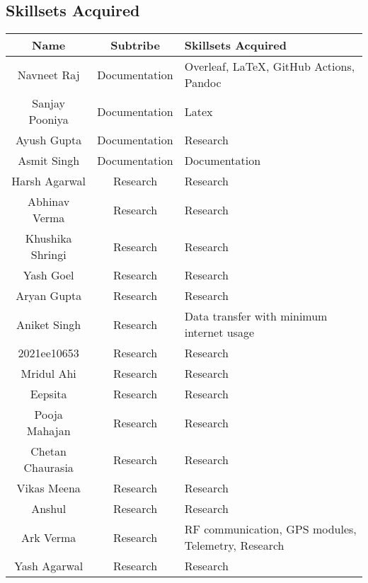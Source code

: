 \subsection{Skillsets Acquired}
\begin{center}
    \label{table:skillsets}
    \begin{longtable}{ | c | c | m{6cm} | }
        \hline
        \textbf{Name}              & \textbf{Subtribe} & \textbf{Skillsets Acquired}                                             \\
        \hline \hline
        Navneet Raj & Documentation & Overleaf, LaTeX, GitHub Actions, Pandoc\\ 
        \hline 
        Sanjay Pooniya & Documentation & Latex\\ 
        \hline 
        Ayush Gupta & Documentation & Research\\ 
        \hline 
        Asmit Singh & Documentation & Documentation\\ 
        \hline 
        Harsh Agarwal & Research & Research\\ 
        \hline 
        Abhinav Verma & Research & Research\\ 
        \hline 
        Khushika Shringi & Research & Research\\ 
        \hline 
        Yash Goel & Research & Research\\ 
        \hline 
        Aryan Gupta & Research & Research\\ 
        \hline 
        Aniket Singh & Research & Data transfer with minimum internet usage\\ 
        \hline 
        2021ee10653 & Research & Research\\ 
        \hline 
        Mridul Ahi & Research & Research\\ 
        \hline 
        Eepsita & Research & Research\\ 
        \hline 
        Pooja Mahajan & Research & Research\\ 
        \hline 
        Chetan Chaurasia & Research & Research\\ 
        \hline 
        Vikas Meena & Research & Research\\ 
        \hline 
        Anshul & Research & Research\\ 
        \hline 
        Ark Verma & Research & RF communication, GPS modules, Telemetry, Research\\ 
        \hline 
        Yash Agarwal & Research & Research\\ 

\end{longtable}
\end{center}
